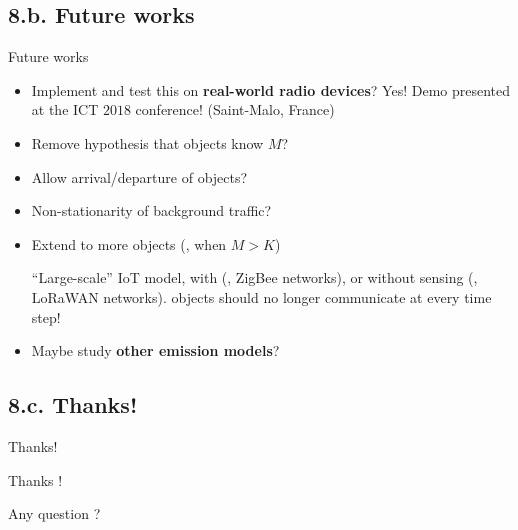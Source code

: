 \documentclass[12pt,english,ignorenonframetext,aspectratio=169,]{beamer}
\newcommand{\Fontify}{}
\providecommand{\tightlist}{%
  \setlength{\itemsep}{0pt}\setlength{\parskip}{0pt}}
\begin{document}
\subsection{\hfill{}8.b. Future works\hfill{}}

\begin{frame}{Future works}

\begin{itemize}\tightlist
\item
  Implement and test this on \textbf{real-world radio devices}?
  \hook Yes! Demo presented at the ICT \(2018\) conference! (Saint-Malo, France)

\vspace*{15pt}
\pause

\item
  Remove hypothesis that objects know \(M\)?
\item
  Allow arrival/departure of objects?
\item
  Non-stationarity of background traffic?

\vspace*{15pt}
\pause

\item Extend to more objects (\ie, when \(M > K\))

``Large-scale'' IoT model,
with (\eg, ZigBee networks),
or without sensing (\eg, LoRaWAN networks).
\hook objects should no longer communicate at every time step!

\vspace*{15pt}
\pause

\item
  Maybe study \textbf{other emission models}?

\end{itemize}

\end{frame}


\subsection{\hfill{}8.c. Thanks!\hfill{}}

\begin{frame}{Thanks!}

\begin{center}\begin{Huge}
  {\Fontify Thanks !}
  \Smiley[0.9]
\end{Huge}\end{center}

\vspace*{20pt}

\begin{center}\begin{Huge}
  {\Fontify Any question ?}
\end{Huge}\end{center}

\end{frame}
\end{document}

